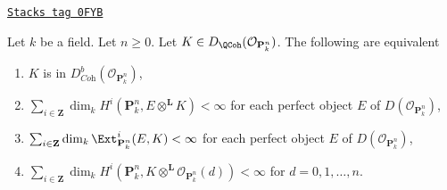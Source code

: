 \begin{lemma}
\label{equiv-lemma-coherent-on-projective-space}
\href{https://stacks.math.columbia.edu/tag/0FYB}{\texttt{Stacks tag 0FYB}}

Let $k$ be a field. Let $n \geq 0$. Let
$K \in D_\QCoh(\mathcal{O}_{\mathbf{P}^n_k})$.
The following are equivalent
\begin{enumerate}
\item $K$ is in $D^b_{\textit{Coh}}(\mathcal{O}_{\mathbf{P}^n_k})$,
\item $\sum_{i \in \mathbf{Z}}
\dim_k H^i(\mathbf{P}^n_k, E \otimes^\mathbf{L} K) < \infty$
for each perfect object $E$ of
$D(\mathcal{O}_{\mathbf{P}^n_k})$,
\item $\sum_{i \in \mathbf{Z}}
\dim_k \Ext^i_{\mathbf{P}^n_k}(E, K) < \infty$
for each perfect object $E$ of $D(\mathcal{O}_{\mathbf{P}^n_k})$,
\item $\sum_{i \in \mathbf{Z}} \dim_k H^i(\mathbf{P}^n_k,
K \otimes^\mathbf{L} \mathcal{O}_{\mathbf{P}^n_k}(d)) < \infty$
for $d = 0, 1, \ldots, n$.
\end{enumerate}
\end{lemma}

